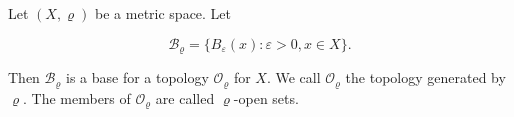 Let $(X, \varrho)$ be a metric space. Let

$$\mathcal{B}_{\varrho} = \{B_{\varepsilon}(x) : \varepsilon > 0, x \in X\}.$$

Then $\mathcal{B}_{\varrho}$ is a base for a topology $\mathcal{O}_{\varrho}$ for $X$. We call $\mathcal{O}_{\varrho}$ the topology generated by $\varrho$. The members of $\mathcal{O}_{\varrho}$ are called $\varrho$-open sets.